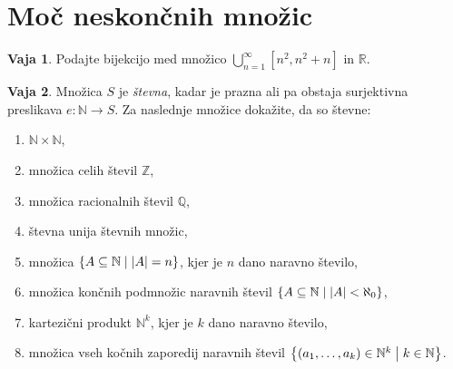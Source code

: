 \documentclass{article}
\newcommand{\NN}{\mathbb{N}}
\newcommand{\ZZ}{\mathbb{Z}}
\newcommand{\QQ}{\mathbb{Q}}
\theoremstyle{definition}
\newtheorem{vaja}{Vaja}
\begin{document}









\section{Moč neskončnih množic}

\begin{vaja}
  Podajte bijekcijo med množico $\bigcup_{n = 1}^{\infty} [n^2, n^2 + n]$ in $\mathbb{R}$.
\end{vaja}

\begin{vaja}
  Množica $S$ je \emph{števna}, kadar je prazna ali pa obstaja surjektivna preslikava $e\colon \NN \to S$. Za naslednje množice dokažite, da so števne:
  \begin{enumerate}
    \item
      $\NN \times \NN$,
    \item
      množica celih števil $\ZZ$,
    \item
      množica racionalnih števil $\QQ$,
    \item
      števna unija števnih množic,
    \item
      množica $\set{A \subseteq \NN}{|A| = n}$, kjer je $n$ dano naravno število,
    \item
      množica končnih podmnožic naravnih števil $\set{A \subseteq \NN}{|A| < \aleph_0}$,
    \item
      kartezični produkt $\NN^k$, kjer je $k$ dano naravno število,
    \item
      množica vseh kočnih zaporedij naravnih števil $\set{(a_1, \ldots, a_k) \in \NN^k}{k \in \NN}$.
  \end{enumerate}
\end{vaja}
\end{document}
